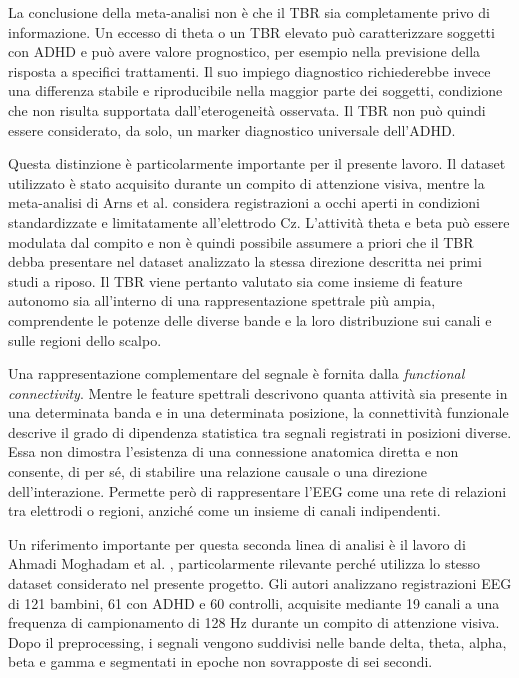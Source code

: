 La conclusione della meta-analisi non è che il TBR sia completamente
privo di informazione. Un eccesso di theta o un TBR elevato può
caratterizzare  soggetti con ADHD e può avere valore
prognostico, per esempio nella previsione della risposta a specifici
trattamenti. Il suo impiego diagnostico richiederebbe invece una
differenza stabile e riproducibile nella maggior parte dei soggetti,
condizione che non risulta supportata dall'eterogeneità osservata.
Il TBR non può quindi essere considerato, da solo, un marker
diagnostico universale dell'ADHD.

Questa distinzione è particolarmente importante per il presente
lavoro. Il dataset utilizzato è stato acquisito durante un compito di
attenzione visiva, mentre la meta-analisi di Arns et al. considera
registrazioni a occhi aperti in condizioni standardizzate e
limitatamente all'elettrodo Cz. L'attività theta e beta può essere
modulata dal compito e non è quindi possibile assumere a priori che il
TBR debba presentare nel dataset analizzato la stessa direzione
descritta nei primi studi a riposo. Il TBR viene pertanto valutato sia
come insieme di feature autonomo sia all'interno di una
rappresentazione spettrale più ampia, comprendente le potenze delle
diverse bande e la loro distribuzione sui canali e sulle regioni dello
scalpo.

Una rappresentazione complementare del segnale è fornita dalla
\textit{functional connectivity}. Mentre le feature spettrali
descrivono quanta attività sia presente in una determinata banda e in
una determinata posizione, la connettività funzionale descrive il
grado di dipendenza statistica tra segnali registrati in posizioni
diverse. Essa non dimostra l'esistenza di una connessione anatomica
diretta e non consente, di per sé, di stabilire una relazione causale
o una direzione dell'interazione. Permette però di rappresentare
l'EEG come una rete di relazioni tra elettrodi o regioni, anziché come
un insieme di canali indipendenti.

Un riferimento importante per questa seconda linea di analisi è il
lavoro di Ahmadi Moghadam et al. \cite{Moghadam2024}, particolarmente
rilevante perché utilizza lo stesso dataset considerato nel presente
progetto. Gli autori analizzano registrazioni EEG di 121 bambini,
61 con ADHD e 60 controlli, acquisite mediante 19 canali a una
frequenza di campionamento di 128 Hz durante un compito di attenzione
visiva. Dopo il preprocessing, i segnali vengono suddivisi nelle
bande delta, theta, alpha, beta e gamma e segmentati in epoche non
sovrapposte di sei secondi.

